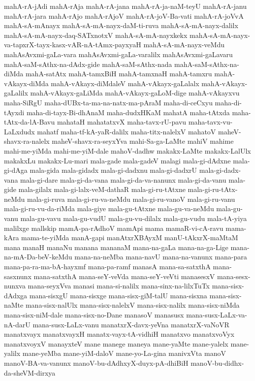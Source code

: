 {mahA-rA-jAdi
mahA-rAja
mahA-rA-jana
mahA-rA-ja-naM-teyU
mahA-rA-janu
mahA-rA-jara
mahA-rAjo
mahA-rAjoV
mahA-rA-joV-Ba-vati
mahA-rA-joVvA
mahA-sA-mAnayx
mahA-sA-mA-nayx-daM-ti-ruva
mahA-sA-mA-nayx-dalilx
mahA-sA-mA-nayx-daq-SATxnotxV
mahA-sA-mA-nayxkekx
mahA-sA-mA-nayx-va-tapxrX-tayx-kasx-vAR-nA-tAmx-payxyaH
mahA-sA-mA-nayx-veMdu
mahAsAvxmi-gaLa-vara
mahAsAvxmi-gaLa-varalilx
mahAsAvxmi-gaLavaru
mahA-saM-sAthx-na-dAdx-gide
mahA-saM-sAthx-nada
mahA-saM-sAthx-na-diMda
mahA-satAtx
mahA-tamxBiH
mahA-tamxnaH
mahA-tamxru
mahA-vAkayx-diMda
mahA-vAkayx-diMdaleV
mahA-vAkayx-gaLalalx
mahA-vAkayx-gaLalilx
mahA-vAkayx-gaLiMda
mahA-vAkayx-gaLoM-dige
mahA-vAkayxvu
maha-SiRgU
maha-dUBx-ta-ma-na-natx-ma-pAraM
maha-di-ceCxyu
maha-di-tAyxdi
maha-di-tayx-Bi-dhAnaM
maha-dudxHKaM
mahatA
maha-tAtxda
maha-tAtx-da-lA-Bavu
mahataH
mahatatxvX
maha-tavx-rU-pavu
maha-tavx-vu-LaLxdudx
mahatf
maha-tf-kA-yaR-dalilx
maha-titx-nalelxV
mahatoV
maheV-shavx-ra-nalelx
maheV-shavx-ra-seyxYva
mahi-Sa-ga-LaMte
mahiV
mahime
mahi-me-yiMda
mahi-me-yiM-dale
mahoV-dadhw
makakx-LaMte
makakx-LalUlx
makakxLu
makakx-Lu-mari
mala-gade
mala-gadeV
malagi
mala-gi-dAdxne
mala-gi-dAga
mala-gida
mala-gidadx
mala-gi-dadxnu
mala-gi-dadxrU
mala-gi-dadx-vana
mala-gi-dare
mala-gi-da-vana
mala-gi-da-va-nanunx
mala-gi-da-vanu
mala-gide
mala-gilalx
mala-gi-lalx-veM-dathaR
mala-gi-ru-tAtxne
mala-gi-ru-tAtx-neMdu
mala-gi-ruva
mala-gi-ru-va-neMdu
mala-gi-ru-vanoV
mala-gi-ru-vanu
mala-gi-ru-vu-da-riMda
mala-giye
mala-gu-tAtxne
mala-gu-va-neMdu
mala-gu-vanu
mala-gu-vavu
mala-gu-vudU
mala-gu-vu-dilalx
mala-gu-vudu
mala-tA-yiya
malilxge
mallskip
mamA-pa-rAdhoV
mamApi
mama
mamaR-vi-cA-ravu
mama-kAra
mama-te-yiMda
manA-gapi
manAtxrXBAyxM
manU-tAkxrX-maMtaM
mana
manaH
manaNu
manana
mananaM
mana-na-gaLa
mana-na-ga-Lige
mana-na-mA-Da-beV-keMdu
mana-na-neMba
mana-navU
mana-na-vanunx
mana-para
mana-pa-ra-ma-bA-hayxmf
mana-pa-ramf
manasA
mana-sa-satxthA
mana-sasxnunx
mana-satxthA
mana-seY-veVda
mana-seY-veVti
manasesxV
mana-sesx-nunxva
mana-seyxVva
manasi
mana-si-nalilx
mana-sinx-na-lilxTuTx
mana-sisx-dAdxga
mana-sisxgU
mana-sisxge
mana-sisx-giM-talU
mana-sisxna
mana-sisx-naMte
mana-sisx-nalUlx
mana-sisx-nalelxV
mana-sisx-nalilx
mana-sisx-niMda
mana-sisx-niM-dale
mana-sisx-no-Dane
manasoV
manasusx
mana-susx-LaLx-va-nA-darU
mana-susx-LaLx-vanu
manatxrX-davx-yeVna
manatxrX-vaNoVR
manatxvayx
manatxvayxH
manatx-vayx-tA-vidhiH
manatxvo
manatxvoVyx
manatxvoyxV
manayxteV
mane
manege
maneya
mane-yaMte
mane-yalelx
mane-yalilx
mane-yeMba
mane-yiM-daloV
mane-yo-La-gina
manivxVta
manoV
manoV-BA-va-vanunx
manoV-bu-dAdhxyX-duyx-pA-dhiBiH
manoV-bu-didhx-da-sheVM-dirxya
}
